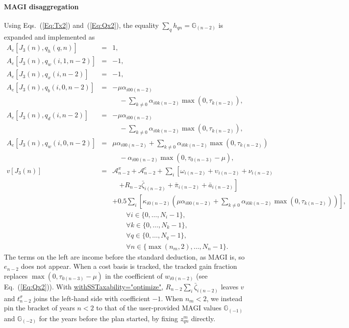 \documentclass[fleqn,12pt]{report}
\newcommand{\code}[1]{\url{#1}}
\begin{document}
\paragraph*{MAGI disaggregation}
Using Eqs.~(\ref{Eq:Tx2}) and~(\ref{Eq:Qx2}), the equality
$\sum_q h_{qn} = \mathbb{G}_{(n-2)}$ is expanded and implemented as
\begin{eqnarray}
	A_e[J_3(n), q_{h}(q, n)] &=& 1, \nonumber \\
	A_e[J_3(n), q_{w}(i, 1, n-2)] &=& -1, \nonumber \\
	A_e[J_3(n), q_{x}(i, n-2)] &=& -1, \nonumber \\
	A_e[J_3(n), q_{b}(i, 0, n-2)] &=&
	    - \mu \alpha_{i00(n-2)} \nonumber \\
	    &&\quad -\sum_{k\neq 0} \alpha_{i0k(n-2)}\max(0, \tau_{k(n-2)}), \nonumber \\
	A_e[J_3(n), q_{d}(i, n-2)] &=&
	    - \mu \alpha_{i00(n-2)} \nonumber \\
	    &&\quad -\sum_{k\neq 0} \alpha_{i0k(n-2)}\max(0, \tau_{k(n-2)}), \nonumber \\
	A_e[J_3(n), q_{w}(i, 0, n-2)] &=&
	    \mu \alpha_{i00(n-2)} + \sum_{k\neq 0} \alpha_{i0k(n-2)}\max(0, \tau_{k(n-2)}) \nonumber \\
	    && \quad - \alpha_{i00(n-2)}\max(0, \tau_{0(n-3)} - \mu), \nonumber \\
	v[J_3(n)] &=& \mathcal{A}^x_{n-2} + \mathcal{A}^c_{n-2}
	+ \sum_i \left[\omega_{i(n-2)} + \upsilon_{i(n-2)} + \nu_{i(n-2)} \right. \nonumber \\
	&& \quad \left. + R_{n-2}\bar{\zeta}_{i(n-2)} + \bar{\pi}_{i(n-2)} + \bar{a}_{i(n-2)} \right] \nonumber \\
	&& + 0.5 \sum_i \left[\kappa_{i0(n-2)}  \left(
	  \mu\alpha_{i00(n-2)} + \sum_{k\neq 0} \alpha_{i0k(n-2)}\max(0, \tau_{k(n-2)})
	  \right)\right],\nonumber \\
	&&\qquad\forall i \in \{0,\ldots, N_i - 1\}, \nonumber\\
	&&\qquad\forall k \in \{0,\ldots, N_k - 1\}, \nonumber\\
	&&\qquad\forall q \in \{0,\ldots, N_q - 1\}, \nonumber\\
	&&\qquad\forall n \in \{\max(n_m, 2),\ldots, N_n - 1\}.
\end{eqnarray}
The terms on the left are income before the standard deduction, as MAGI is, so $e_{n-2}$
does not appear.
When a cost basis is tracked, the tracked gain fraction replaces
$\max(0, \tau_{0(n-3)} - \mu)$ in the coefficient of $w_{i0(n-2)}$ (see Eq.~(\ref{Eq:Qx2})).
With \code{withSSTaxability="optimize"}, $R_{n-2}\sum_i\bar{\zeta}_{i(n-2)}$ leaves $v$ and
$t^\sigma_{n-2}$ joins the left-hand side with coefficient $-1$.
When $n_m < 2$, we instead pin the bracket of years $n < 2$ to that of the user-provided
MAGI values $\mathbb{G}_{(-1)}$ and $\mathbb{G}_{(-2)}$ for the years before the plan started,
by fixing $z^m_{qn}$ directly.
\end{document}

